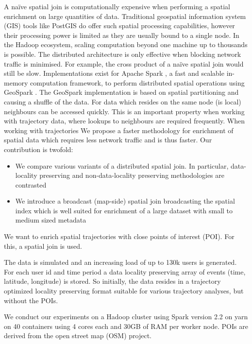 \documentclass[conference]{IEEEtran}
\begin{document}
A naïve spatial join is
computationally expensive when performing a spatial enrichment on large quantities of data. Traditional geospatial information system (GIS) tools like PostGIS do offer such spatial processing capabilities,
however their processing power is limited as they are usually bound to a single node.
In the Hadoop ecosystem, scaling computation beyond one machine up to thousands is possible.
The distributed architecture is only effective when blocking network traffic is minimised. For example, the cross product of a naïve spatial join would still be slow.
Implementations exist for Apache Spark \cite{Zaharia2012}, a fast and scalable in-memory computation framework, to perform distributed spatial operations using GeoSpark \cite{Yu2019}.
The GeoSpark implementation is based on spatial partitioning and causing a shuffle of the data.
For data which resides on the same node (is local) neighbours can be accessed quickly.
This is an important property when working with trajectory data, where lookups to neighbours are required frequently.
When working with trajectories
We propose a faster methodology for enrichment of spatial data which requires less network traffic and is thus faster. Our contribution is twofold:
\begin{itemize}
  \item We compare various variants of a distributed spatial join. In particular, data-locality preserving and non-data-locality preserving methodologies are contrasted
  \item We introduce a broadcast (map-side) spatial join broadcasting the spatial index which is well suited for enrichment of a large dataset with small to medium sized metadata
\end{itemize}


We want to enrich spatial trajectories with close points of interest (POI). For this, a spatial join is used.

The data is simulated and an increasing load of up to 130k users is generated.
For each user id and time period a data locality preserving array of events (time, latitude, longitude) is stored.
So initially, the data resides in a trajectory optimized locality preserving format suitable for various trajectory analyses, but without the POIs.

We conduct our experiments on a Hadoop cluster using Spark version 2.2 on yarn on 40 containers using 4 cores each and 30GB of RAM per worker node. POIs are derived from the open street map (OSM) project.
\end{document}
